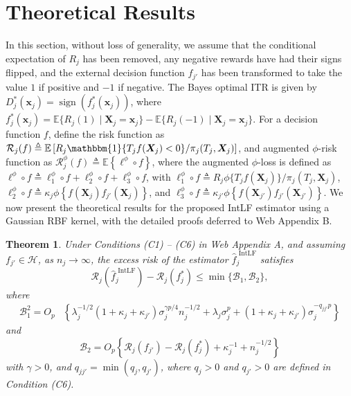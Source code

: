 \documentclass[12pt]{article}
\newtheorem{theorem}{Theorem}
\DeclareMathOperator{\sign}{sign}
\begin{document}
\section{Theoretical Results}\label{sec: tr}
In this section, without loss of generality, we assume that the conditional expectation of $R_j$ has been removed, any negative rewards have had their signs flipped, and the external decision function $f_{j'}$ has been transformed to take the value $1$ if positive and $-1$ if negative. The Bayes optimal ITR is given by $D_j^*(\boldsymbol x_j) = \sign(f_j^*(\boldsymbol x_j))$, where 
$f_j^*(\boldsymbol x_j) = \mathbb{E}\{R_j(1) \mid \boldsymbol X_j = \boldsymbol x_j\} - \mathbb{E}\{R_j(-1) \mid \boldsymbol X_j = \boldsymbol x_j\}$. For a decision function $f$, define the risk function as 
$\mathcal{R}_j(f) \triangleq \mathbb{E}\left[R_j\mathbbm{1}\{T_j f(\boldsymbol X_j)<0\}/\pi_j(T_j,\boldsymbol X_j)\right]$, and augmented $\phi$-risk function as $\mathcal{R}^\phi_j(f) \triangleq \mathbb{E}\left\{\ell^\phi \circ f\right\}$, where  the augmented $\phi$-loss is defined as $\ell^\phi \circ f\triangleq \ell^\phi_1 \circ f + \ell^\phi_2 \circ f + \ell^\phi_3 \circ f$, with $\ell^\phi_1 \circ f \triangleq R_j \phi\{T_j f(\boldsymbol X_j)\}/\pi_j(T_j, \boldsymbol X_j)$, $\ell^\phi_2 \circ f \triangleq \kappa_j \phi\left\{f(\boldsymbol X_j) f_{j'}(\boldsymbol X_j)\right\}$, and $\ell^\phi_3 \circ f \triangleq \kappa_{j'} \phi\left\{f(\boldsymbol X_{j'}) f_{j'}(\boldsymbol X_{j'})\right\}$. We now present the theoretical results for the proposed IntLF estimator using a Gaussian RBF kernel, with the detailed proofs deferred to Web Appendix B.

\begin{theorem}\label{thm1}
Under Conditions (C1) – (C6) in Web Appendix A, and assuming $f_{j'}\in\mathcal{H}$, as $n_j\to\infty$, the excess risk of the estimator $\widehat{f}^\text{\ IntLF}_j$ satisfies 
\begin{equation*}\mathcal{R}_j\left(\widehat{f}^\text{\ IntLF}_j\right) - \mathcal{R}_j(f_j^*) \leq \min\{\mathcal{B}_1, \mathcal{B}_2\},
\end{equation*}
where 
\begin{align*}
\mathcal{B}_1^2=O_p&\left\{\lambda_j^{-1/2}\left(1 + \kappa_j+\kappa_{j'}\right)\sigma_j^{\gamma p/4}n_j^{-1/2} +\lambda_j \sigma_j^p + (1 + \kappa_j + \kappa_{j'})\sigma_j^{-q_{jj'} p}\right\}
\end{align*}
and
\[
\mathcal{B}_2=O_p\left\{\mathcal{R}_j\left(f_{j'}\right) - \mathcal{R}_j\left(f_j^*\right) + \kappa_j^{-1}+n_j^{-1/2}\right\}
\]
with $\gamma > 0$, and $q_{jj'}=\min\left(q_j, q_{j'}\right)$, where $q_j>0$ and $q_{j'}>0$ are defined in Condition (C6).
\end{theorem}
\end{document}
